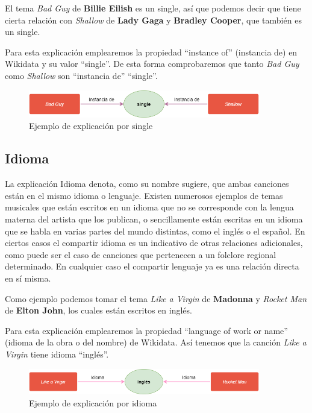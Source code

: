 El tema \textit{Bad Guy} de \textbf{Billie Eilish} es un single, así que podemos decir que tiene cierta relación con \textit{Shallow} de \textbf{Lady Gaga} y \textbf{Bradley Cooper}, que también es un single.

Para esta explicación emplearemos la propiedad ``instance of'' (instancia de) en Wikidata y su valor ``single''. De esta forma comprobaremos que tanto \textit{Bad Guy} como \textit{Shallow} son ``instancia de'' ``single''.\\

\begin{figure}[h!]
	\centering
	\includegraphics[width = 0.9\textwidth]{Imagenes/Bitmap/Single ejemplo.png}
	\caption{Ejemplo de explicación por single}
	\label{fig:sampleImage}
\end{figure}

\subsection*{Idioma}

La explicación Idioma denota, como su nombre sugiere, que ambas canciones están en el mismo idioma o lenguaje. Existen numerosos ejemplos de temas musicales que están escritos en un idioma que no se corresponde con la lengua materna del artista que los publican, o sencillamente están escritas en un idioma que se habla en varias partes del mundo distintas, como el inglés o el español. En ciertos casos el compartir idioma es un indicativo de otras relaciones adicionales, como puede ser el caso de canciones que pertenecen a un folclore regional determinado. En cualquier caso el compartir lenguaje ya es una relación directa en sí misma.

Como ejemplo podemos tomar el tema \textit{Like a Virgin} de \textbf{Madonna} y \textit{Rocket Man} de \textbf{Elton John}, los cuales están escritos en inglés.

Para esta explicación emplearemos la propiedad ``language of work or name'' (idioma de la obra o del nombre) de Wikidata. Así tenemos que la canción \textit{Like a Virgin} tiene idioma ``inglés''.\\

\begin{figure}[h!]
	\centering
	\includegraphics[width = 0.9\textwidth]{Imagenes/Bitmap/Idioma ejemplo.png}
	\caption{Ejemplo de explicación por idioma}
	\label{fig:sampleImage}
\end{figure}


